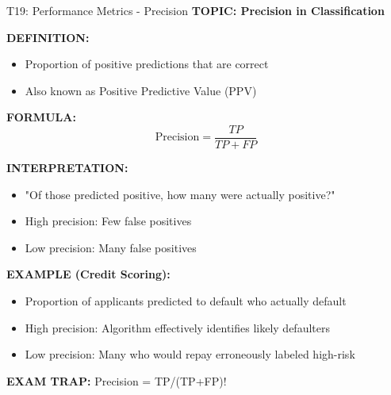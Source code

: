 \documentclass[8pt]{beamer}
\begin{document}
	\begin{frame}{T19: Performance Metrics - Precision}
		\fontsize{6.5}{7.5}\selectfont
		\textbf{TOPIC: Precision in Classification}
		
		\vspace{0.1cm}
		\textbf{DEFINITION:}
		\begin{itemize}
			\item Proportion of positive predictions that are correct
			\item Also known as Positive Predictive Value (PPV)
		\end{itemize}
		
		\vspace{0.1cm}
		\textbf{FORMULA:}
		\[
		\text{Precision} = \frac{TP}{TP+FP}
		\]
		
		\vspace{0.1cm}
		\textbf{INTERPRETATION:}
		\begin{itemize}
			\item "Of those predicted positive, how many were actually positive?"
			\item High precision: Few false positives
			\item Low precision: Many false positives
		\end{itemize}
		
		\vspace{0.1cm}
		\textbf{EXAMPLE (Credit Scoring):}
		\begin{itemize}
			\item Proportion of applicants predicted to default who actually default
			\item High precision: Algorithm effectively identifies likely defaulters
			\item Low precision: Many who would repay erroneously labeled high-risk
		\end{itemize}
		
		\textcolor{myred}{\textbf{EXAM TRAP:}} Precision = \textcolor{myblue}{TP/(TP+FP)}!
	\end{frame}
	
\end{document}
